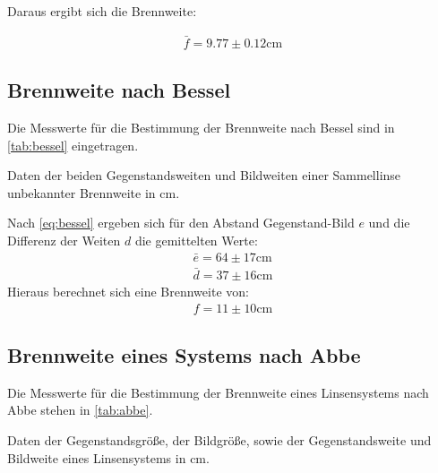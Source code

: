Daraus ergibt sich die Brennweite:

\begin{align*}
  \bar{f} = 9.77\pm0.12\si{\centi\metre}
\end{align*}
\newpage
\subsection{Brennweite nach Bessel}
Die Messwerte für die Bestimmung der Brennweite nach Bessel sind in \autoref{tab:bessel} eingetragen.

\begin{table}
  \centering
  \caption{Daten der beiden Gegenstandsweiten und Bildweiten einer Sammellinse unbekannter Brennweite in $\si{\centi\metre}$.}
  \label{tab:bessel}
\end{table}

Nach \autoref{eq:bessel} ergeben sich für den Abstand Gegenstand-Bild $e$ und die Differenz der Weiten $d$ die gemittelten Werte:
\begin{align*}
  \bar{e} = 64\pm 17 \si{\centi\metre}\\
  \bar{d} = 37\pm 16 \si{\centi\metre}
\end{align*}
Hieraus berechnet sich eine Brennweite von:
\begin{align*}
  f = 11\pm 10 \si{\centi\metre}
\end{align*}

\subsection{Brennweite eines Systems nach Abbe}
Die Messwerte für die Bestimmung der Brennweite eines Linsensystems nach Abbe stehen in \autoref{tab:abbe}.

\begin{table}
  \centering
  \caption{Daten der Gegenstandsgröße, der Bildgröße, sowie der Gegenstandsweite und Bildweite eines Linsensystems in $\si{\centi\metre}$.}
  \label{tab:abbe}
\end{table}

